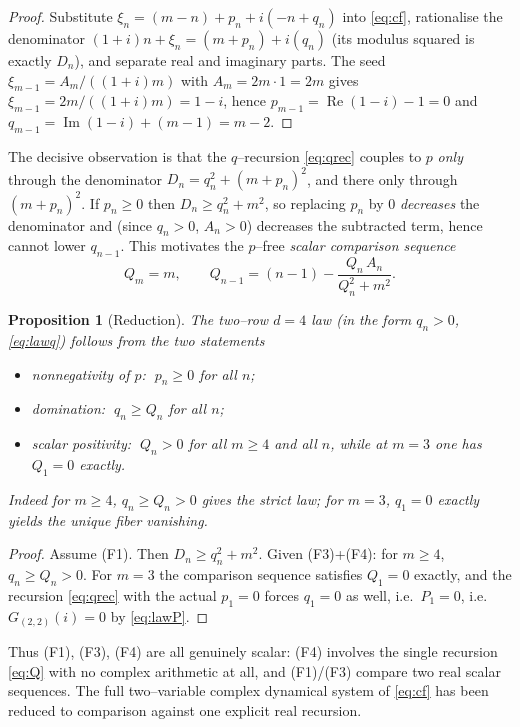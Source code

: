 \documentclass[11pt]{article}
\newtheorem{proposition}{Proposition}
\theoremstyle{definition}
\renewcommand{\Re}{\operatorname{Re}}
\renewcommand{\Im}{\operatorname{Im}}
\begin{document}
\begin{proof}
Substitute $\xi_n=(m-n)+p_n+i(-n+q_n)$ into \eqref{eq:cf}, rationalise the
denominator $(1+i)n+\xi_n=(m+p_n)+i(q_n)$ (its modulus squared is exactly
$D_n$), and separate real and imaginary parts. The seed $\xi_{m-1}=A_m/((1+i)m)$
with $A_m=2m\cdot1=2m$ gives $\xi_{m-1}=2m/((1+i)m)=1-i$, hence
$p_{m-1}=\Re(1-i)-1=0$ and $q_{m-1}=\Im(1-i)+(m-1)=m-2$.
\end{proof}

The decisive observation is that the $q$--recursion \eqref{eq:qrec} couples to
$p$ \emph{only} through the denominator $D_n=q_n^2+(m+p_n)^2$, and there only
through $(m+p_n)^2$. If $p_n\ge0$ then $D_n\ge q_n^2+m^2$, so replacing $p_n$ by
$0$ \emph{decreases} the denominator and (since $q_n>0$, $A_n>0$) decreases the
subtracted term, hence cannot lower $q_{n-1}$. This motivates the $p$--free
\emph{scalar comparison sequence}
\begin{equation}\label{eq:Q}
  Q_m=m,
  \qquad
  Q_{n-1}=(n-1)-\frac{Q_n\,A_n}{Q_n^2+m^2}.
\end{equation}

\begin{proposition}[Reduction]\label{prop:reduction}
The two--row $d{=}4$ law (in the form $q_n>0$, \eqref{eq:lawq}) follows from the
two statements
\begin{itemize}
\item[\textnormal{(F1)}] \emph{nonnegativity of} $p$: $\;p_n\ge0$ for all $n$;
\item[\textnormal{(F3)}] \emph{domination}: $\;q_n\ge Q_n$ for all $n$;
\item[\textnormal{(F4)}] \emph{scalar positivity}: $\;Q_n>0$ for all $m\ge4$ and
all $n$, while at $m=3$ one has $Q_1=0$ exactly.
\end{itemize}
Indeed for $m\ge4$, $q_n\ge Q_n>0$ gives the strict law; for $m=3$, $q_1=0$
exactly yields the unique fiber vanishing.
\end{proposition}

\begin{proof}
Assume (F1). Then $D_n\ge q_n^2+m^2$. Given (F3)+(F4): for $m\ge4$,
$q_n\ge Q_n>0$. For $m=3$ the comparison sequence satisfies $Q_1=0$ exactly, and
the recursion \eqref{eq:qrec} with the actual $p_1=0$ forces $q_1=0$ as well,
i.e.\ $P_1=0$, i.e.\ $G_{(2,2)}(i)=0$ by \eqref{eq:lawP}.
\end{proof}

Thus (F1), (F3), (F4) are all genuinely scalar: (F4) involves the single
recursion \eqref{eq:Q} with no complex arithmetic at all, and (F1)/(F3) compare
two real scalar sequences. The full two--variable complex dynamical system of
\eqref{eq:cf} has been reduced to comparison against one explicit real recursion.
\end{document}
